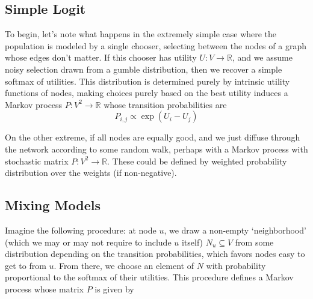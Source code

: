\documentclass{article}
\theoremstyle{definition}
\begin{document}
	\subsection{Simple Logit}
	To begin, let's note what happens in the extremely simple case where the population is modeled by a single chooser, selecting between the nodes of a graph whose edges don't matter. If this chooser has utility $U : V \to \mathbb R$, and we assume noisy selection drawn from a gumble distribution, then we recover a simple softmax of utilities. This distribution is determined purely by intrinsic utility functions of nodes, making choices purely based on the best utility induces a Markov process $P : V^2 \to \mathbb R$ whose transition probabilities are	
	\[ P_{i,j} \propto \exp (U_i - U_j) \]%
	
	On the other extreme, if all nodes are equally good, and we just diffuse through the network according to some random walk, perhaps with a Markov process with stochastic matrix $P : V^2 \to \mathbb R$. These could be defined by weighted probability distribution over the weights (if non-negative).
	
	\subsection{Mixing Models}
%	
%	
%	
%	
%	
	Imagine the following procedure: at node $u$, we draw a non-empty `neighborhood' (which we may or may not require to include $u$ itself) $N_u \subseteq V$ from some distribution depending on the transition probabilities, which favors nodes easy to get to from $u$. From there, we choose an element of $N$ with probability proportional to the softmax of their utilities. This procedure defines a Markov process whose matrix $P$ is given by
	
\end{document}
